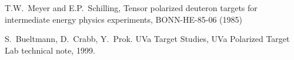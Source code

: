 \documentclass[11pt]{article}
\begin{document}



%
\newpage
\begin{thebibliography}{6}

 T.W.~Meyer and E.P.~Schilling, Tensor polarized deuteron targets for intermediate energy physics experiments, BONN-HE-85-06 (1985)

 S.~Bueltmann, D.~Crabb, Y.~Prok. UVa Target Studies, UVa Polarized Target Lab technical note, 1999.





\end{thebibliography} 
\end{document}

